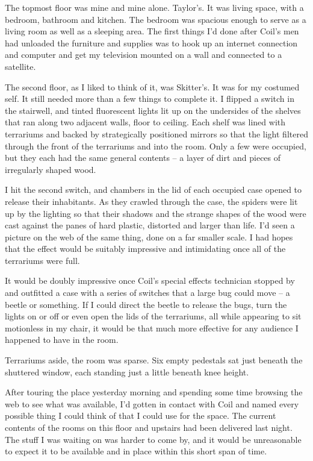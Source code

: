 The topmost floor was mine and mine alone.  Taylor's.  It was living space, with a bedroom, bathroom and kitchen.  The bedroom was spacious enough to serve as a living room as well as a sleeping area.  The first things I'd done after Coil's men had unloaded the furniture and supplies was to hook up an internet connection and computer and get my television mounted on a wall and connected to a satellite.



The second floor, as I liked to think of it, was Skitter's.  It was for my costumed self.  It still needed more than a few things to complete it.  I flipped a switch in the stairwell, and tinted fluorescent lights lit up on the undersides of the shelves that ran along two adjacent walls, floor to ceiling.  Each shelf was lined with terrariums and backed by strategically positioned mirrors so that the light filtered through the front of the terrariums and into the room.  Only a few were occupied, but they each had the same general contents – a layer of dirt and pieces of irregularly shaped wood.



I hit the second switch, and chambers in the lid of each occupied case opened to release their inhabitants.  As they crawled through the case, the spiders were lit up by the lighting so that their shadows and the strange shapes of the wood were cast against the panes of hard plastic, distorted and larger than life.  I'd seen a picture on the web of the same thing, done on a far smaller scale.  I had hopes that the effect would be suitably impressive and intimidating once all of the terrariums were full.



It would be doubly impressive once Coil's special effects technician stopped by and outfitted a case with a series of switches that a large bug could move – a beetle or something.  If I could direct the beetle to release the bugs, turn the lights on or off or even open the lids of the terrariums, all while appearing to sit motionless in my chair, it would be that much more effective for any audience I happened to have in the room.



Terrariums aside, the room was sparse.  Six empty pedestals sat just beneath the shuttered window, each standing just a little beneath knee height.



After touring the place yesterday morning and spending some time browsing the web to see what was available, I'd gotten in contact with Coil and named every possible thing I could think of that I could use for the space.  The current contents of the rooms on this floor and upstairs had been delivered last night.  The stuff I was waiting on was harder to come by, and it would be unreasonable to expect it to be available and in place within this short span of time.



